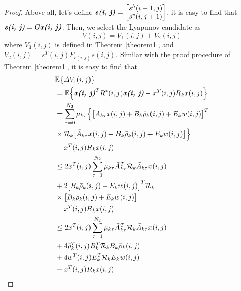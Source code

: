 \documentclass[journal,final,twocolumn]{IEEEtran}
\begin{document}
\begin{proof} 
	Above all, let's define $\emph{\textbf{s(i, j)}} = \begin{bmatrix}
	s^{h}(i+1,j)\\ s^{v}(i,j+1)
	\end{bmatrix}$,  it is easy to find that $\emph{\textbf{s(i, j)}}=G\emph{\textbf{x(i, j)}}$.  Then, we select the Lyapunov candidate as
	\begin{equation}\label{LyapunoovT}
		V(i,j)=V_{1}(i,j)+V_{2}(i,j)
	\end{equation}
	where $V_{1}(i,j)$ is defined in Theorem \ref{theorem1}, and $V_{2}(i,j)=s^{T}(i,j)F_{r(i,j)}s(i,j)$. Similar with the proof procedure of Theorem \ref{theorem1}, it is easy to find that
	\begin{equation} \label{P2T1}
		\begin{split}
				&\mathbb{E}\{\varDelta V_{1}(i,j) \}\\
			&=\mathbb{E}\Big\{\emph{\textbf{x(i, j)}}^{T}R^{*}(i,j)\emph{\textbf{x(i, j)}} - x^{T}(i,j)R_{k}x(i,j)\Big\}\\
			&=  \sum_{\tau =0}^{N_{2}}\mu_{k\tau }\Big\{\big[\bar{A}_{k\tau }x(i,j)+B_{k}\bar{\rho}_{k}(i,j)+E_{k}w(i,j)\big]^{T}\\
			&\times\mathcal{R}_{k} \big[ \bar{A}_{k\tau }x(i,j)+B_{k}\bar{\rho}_{k}(i,j)+E_{k}w(i,j)\big]\Big\}\\
			&-x^{T}(i,j)R_{k}x(i,j)\\
			&\leq 2x^{T}(i,j)\sum_{\tau =1}^{N_{2}}\mu_{k\tau }\bar{A}^{T}_{k\tau }\mathcal{R}_{k}\bar{A}_{k\tau }x(i,j) \\
			&+2\big[B_{k}\bar{\rho}_{k}(i,j)+E_{k}w(i,j)\big]^{T}\mathcal{R}_{k}\\
			&\times\big[B_{k}\bar{\rho}_{k}(i,j)+E_{k}w(i,j)\big]\\
			&-x^{T}(i,j)R_{k}x(i,j)\\
			&\leq 2x^{T}(i,j)\sum_{\tau =1}^{N_{2}}\mu_{k\tau }\bar{A}^{T}_{k\tau }\mathcal{R}_{k}\bar{A}_{k\tau }x(i,j) \\
			&+ 4\bar{\rho}^{T}_{k}(i,j)B^{T}_{k}\mathcal{R}_{k}B_{k}\bar{\rho}_{k}(i,j)\\
			&+4w^{T}(i,j)E^{T}_{k}\mathcal{R}_{k}E_{k}w(i,j)\\
			&-x^{T}(i,j)R_{k}x(i,j)

\end{split}
\end{equation}
\end{proof}
\end{document}
